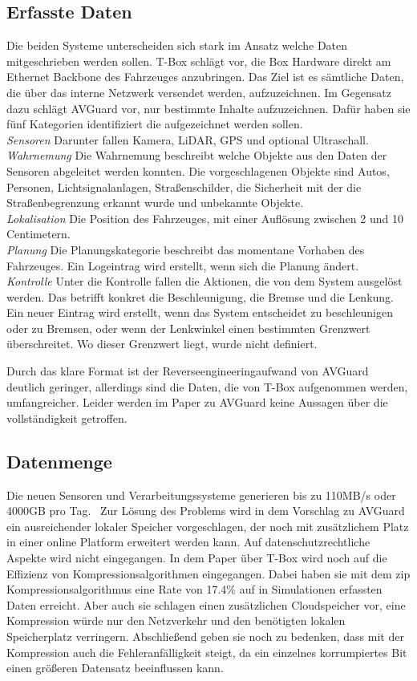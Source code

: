 \documentclass[conference,compsoc,final,a4paper]{IEEEtran}
\begin{document}
\subsection{Erfasste Daten}

Die beiden Systeme unterscheiden sich stark im Ansatz welche Daten mitgeschrieben werden sollen.
T-Box schlägt vor, die Box Hardware direkt am Ethernet Backbone des Fahrzeuges anzubringen.
Das Ziel ist es sämtliche Daten, die über das interne Netzwerk versendet werden, aufzuzeichnen.
Im Gegensatz dazu schlägt AVGuard vor, nur bestimmte Inhalte aufzuzeichnen.
Dafür haben sie fünf Kategorien identifiziert die aufgezeichnet werden sollen.\\
\emph{Sensoren} Darunter fallen Kamera, \ac{LiDAR}, \ac{GPS} und optional Ultraschall.\\
\emph{Wahrnemung} Die Wahrnemung beschreibt welche Objekte aus den Daten der Sensoren abgeleitet werden konnten.
  Die vorgeschlagenen Objekte sind Autos, Personen, Lichtsignalanlagen, Straßenschilder,
  die Sicherheit mit der die Straßenbegrenzung erkannt wurde und unbekannte Objekte.\\
\emph{Lokalisation} Die Position des Fahrzeuges, mit einer Auflösung zwischen 2 und 10 Centimetern.\\
\emph{Planung} Die Planungskategorie beschreibt das momentane Vorhaben des Fahrzeuges.
  Ein Logeintrag wird erstellt, wenn sich die Planung ändert.\\
\emph{Kontrolle} Unter die Kontrolle fallen die Aktionen, die von dem System ausgelöst werden.
  Das betrifft konkret die Beschleunigung, die Bremse und die Lenkung. 
  Ein neuer Eintrag wird erstellt, wenn das System entscheidet zu beschleunigen oder zu Bremsen,
  oder wenn der Lenkwinkel einen bestimmten Grenzwert überschreitet. Wo dieser Grenzwert liegt, wurde nicht definiert.

Durch das klare Format ist der Reverseengineeringaufwand von AVGuard deutlich geringer, allerdings sind die Daten, die
von T-Box aufgenommen werden, umfangreicher. Leider werden im Paper zu AVGuard keine Aussagen über die vollständigkeit getroffen.

\subsection{Datenmenge}
Die neuen Sensoren und Verarbeitungssysteme generieren bis zu 110MB/s oder 4000GB pro Tag.~\cite{Hoque_2021a}
Zur Lösung des Problems wird in dem Vorschlag zu AVGuard ein ausreichender lokaler Speicher vorgeschlagen, der noch mit
zusätzlichem Platz in einer online Platform erweitert werden kann. Auf datenschutzrechtliche Aspekte wird nicht eingegangen.
In dem Paper über T-Box wird noch auf die Effizienz von Kompressionsalgorithmen eingegangen. Dabei haben sie mit dem zip Kompressionsalgorithmus
eine Rate von 17.4\% auf in Simulationen erfassten Daten erreicht. Aber auch sie schlagen einen zusätzlichen Cloudspeicher vor,
eine Kompression würde nur den Netzverkehr und den benötigten lokalen Speicherplatz verringern.
Abschließend geben sie noch zu bedenken, dass mit der Kompression auch die Fehleranfälligkeit steigt, da ein einzelnes korrumpiertes Bit
einen größeren Datensatz beeinflussen kann.
\end{document}
